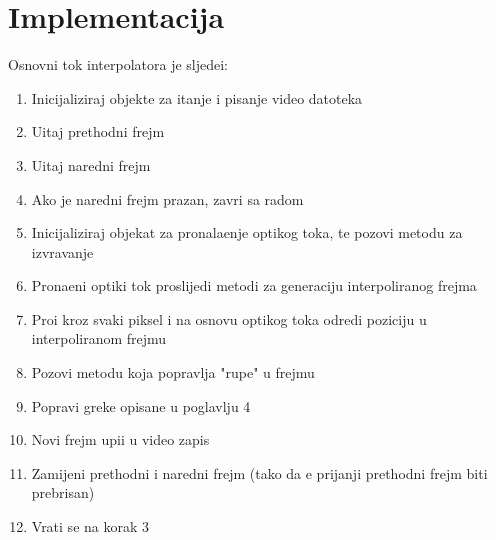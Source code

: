 
\section{Implementacija}
Osnovni tok interpolatora je sljede\cj i\cite{implementation}:
\begin{enumerate}
\item Inicijaliziraj objekte za \ch itanje i pisanje video datoteka
\item U\ch itaj prethodni frejm
\item U\ch itaj naredni frejm
\item Ako je naredni frejm prazan, zavr\sh i sa radom
\item Inicijaliziraj objekat za pronala\zh enje opti\ch kog toka, te pozovi metodu za izvr\sh avanje
\item Prona\dj eni opti\ch ki tok proslijedi metodi za generaciju interpoliranog frejma
\item Pro\dj i kroz svaki piksel i na osnovu opti\ch kog toka odredi poziciju u interpoliranom frejmu
\item Pozovi metodu koja popravlja "rupe" u frejmu
\item Popravi gre\sh ke opisane u poglavlju 4
\item Novi frejm upi\sh i u video zapis
\item Zamijeni prethodni i naredni frejm (tako da \cj e prija\sh nji prethodni frejm biti prebrisan)
\item Vrati se na korak 3
\end{enumerate}

